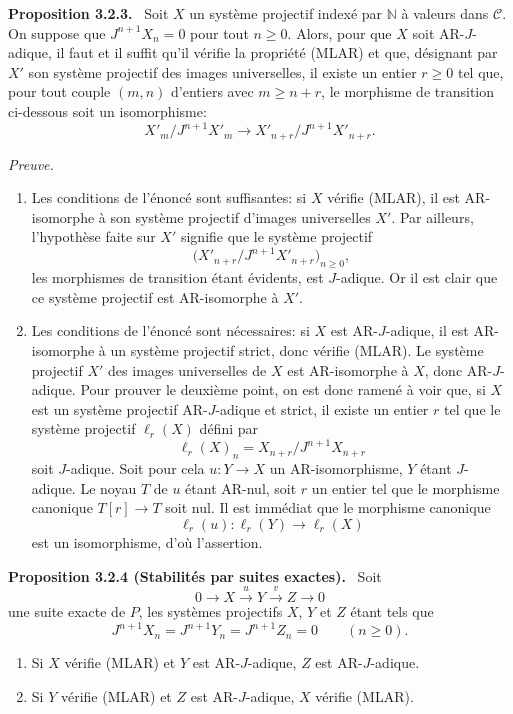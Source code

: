 \documentclass[11pt]{article}
\providecommand{\NN}{\mathbb{N}}
\newenvironment{statement}[1]{\par\medskip\noindent\textbf{#1.}\ }{\par\medskip}
\newenvironment{prooftext}[1][Proof]{\par\noindent\emph{#1.}\ }{\par\medskip}
\providecommand{\NN}{\mathbb N}
\providecommand{\cC}{\mathcal C}
\providecommand{\cC}{\mathcal C}
\begin{document}
\begin{statement}{Proposition 3.2.3}
Soit $X$ un système projectif indexé par $\NN$ à valeurs dans $\cC$. On suppose que $J^{n+1}X_n=0$ pour tout $n\ge0$. Alors, pour que $X$ soit AR-$J$-adique, il faut et il suffit qu'il vérifie la propriété (MLAR) et que, désignant par $X'$ son système projectif des images universelles, il existe un entier $r\ge0$ tel que, pour tout couple $(m,n)$ d'entiers avec $m\ge n+r$, le morphisme de transition ci-dessous soit un isomorphisme:
\[
X'_m/J^{n+1}X'_m\longrightarrow X'_{n+r}/J^{n+1}X'_{n+r}.
\]
\end{statement}

\begin{prooftext}[Preuve]
\begin{enumerate}[label=(\alph*)]
\item Les conditions de l'énoncé sont suffisantes: si $X$ vérifie (MLAR), il est AR-isomorphe à son système projectif d'images universelles $X'$. Par ailleurs, l'hypothèse faite sur $X'$ signifie que le système projectif
\[
\bigl(X'_{n+r}/J^{n+1}X'_{n+r}\bigr)_{n\ge0},
\]
les morphismes de transition étant évidents, est $J$-adique. Or il est clair que ce système projectif est AR-isomorphe à $X'$.
\item Les conditions de l'énoncé sont nécessaires: si $X$ est AR-$J$-adique, il est AR-isomorphe à un système projectif strict, donc vérifie (MLAR). Le système projectif $X'$ des images universelles de $X$ est AR-isomorphe à $X$, donc AR-$J$-adique. Pour prouver le deuxième point, on est donc ramené à voir que, si $X$ est un système projectif AR-$J$-adique et strict, il existe un entier $r$ tel que le système projectif $\ell_r(X)$ défini par
\[
\ell_r(X)_n=X_{n+r}/J^{n+1}X_{n+r}
\]
soit $J$-adique. Soit pour cela $u:Y\to X$ un AR-isomorphisme, $Y$ étant $J$-adique. Le noyau $T$ de $u$ étant AR-nul, soit $r$ un entier tel que le morphisme canonique $T[r]\to T$ soit nul. Il est immédiat que le morphisme canonique
\[
\ell_r(u):\ell_r(Y)\longrightarrow\ell_r(X)
\]
est un isomorphisme, d'où l'assertion.
\end{enumerate}
\end{prooftext}

\begin{statement}{Proposition 3.2.4 (Stabilités par suites exactes)}
Soit
\[
0\longrightarrow X\stackrel{u}{\longrightarrow}Y\stackrel{v}{\longrightarrow}Z\longrightarrow0
\]
une suite exacte de $P$, les systèmes projectifs $X$, $Y$ et $Z$ étant tels que
\[
J^{n+1}X_n=J^{n+1}Y_n=J^{n+1}Z_n=0\qquad(n\ge0).
\]
\begin{enumerate}[label=(\roman*)]
\item Si $X$ vérifie (MLAR) et $Y$ est AR-$J$-adique, $Z$ est AR-$J$-adique.
\item Si $Y$ vérifie (MLAR) et $Z$ est AR-$J$-adique, $X$ vérifie (MLAR).
\end{enumerate}
\end{statement}
\end{document}
